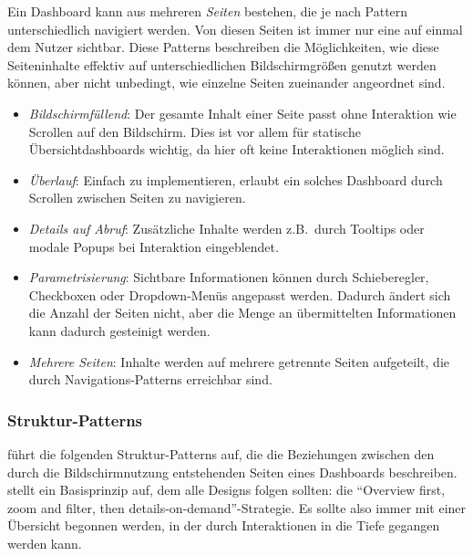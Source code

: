 \autocite[S. 4]{Bach.DashboardDesignPatterns.2023} Ein Dashboard kann aus mehreren \emph{Seiten} bestehen, die je nach Pattern unterschiedlich navigiert werden.
Von diesen Seiten ist immer nur eine auf einmal dem Nutzer sichtbar.
Diese Patterns beschreiben die Möglichkeiten, wie diese Seiteninhalte effektiv auf unterschiedlichen Bildschirmgrößen genutzt werden können, aber nicht unbedingt, wie einzelne Seiten zueinander angeordnet sind.

\begin{itemize}
    \item \emph{Bildschirmfüllend}: Der gesamte Inhalt einer Seite passt ohne Interaktion wie Scrollen auf den Bildschirm.
    Dies ist vor allem für statische Übersichtdashboards wichtig, da hier oft keine Interaktionen möglich sind.
    \item \emph{Überlauf}: Einfach zu implementieren, erlaubt ein solches Dashboard durch Scrollen zwischen Seiten zu navigieren.
    \item \emph{Details auf Abruf}: Zusätzliche Inhalte werden z.B.\ durch Tooltips oder modale Popups bei Interaktion eingeblendet.
    \item \emph{Parametrisierung}: Sichtbare Informationen können durch Schieberegler, Checkboxen oder Dropdown-Menüs angepasst werden.
    Dadurch ändert sich die Anzahl der Seiten nicht, aber die Menge an übermittelten Informationen kann dadurch gesteinigt werden.
    \item \emph{Mehrere Seiten}: Inhalte werden auf mehrere getrennte Seiten aufgeteilt, die durch Navigations-Patterns erreichbar sind.
\end{itemize}

\subsubsection{Struktur-Patterns}

\autocite[S. 4]{Bach.DashboardDesignPatterns.2023} führt die folgenden Struktur-Patterns auf, die die Beziehungen zwischen den durch die Bildschirmnutzung entstehenden Seiten eines Dashboards beschreiben.
\autocite{Shneiderman.TheEyesHaveIt.1996} stellt ein Basisprinzip auf, dem alle Designs folgen sollten: die "`Overview first, zoom and filter, then details-on-demand"'-Strategie.
Es sollte also immer mit einer Übersicht begonnen werden, in der durch Interaktionen in die Tiefe gegangen werden kann.

